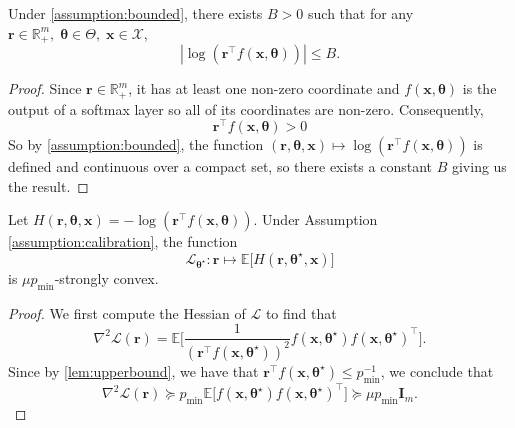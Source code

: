 \begin{lemma}
\label{lem:termbound}
    Under \cref{assumption:bounded}, there exists $B>0$ such that for any $\boldsymbol{r} \in \mathbb{R}_{+}^m,\; \boldsymbol{\theta} \in \Theta,\; \boldsymbol{x} \in \mathcal{X}$,
    \[
        |\log(\boldsymbol{r}^\top f(\boldsymbol{x}, \boldsymbol{\theta}))| \leq B.
    \]
\end{lemma}
\begin{proof}
    Since $\boldsymbol{r} \in \mathbb{R}_{+}^m$, it has at least one non-zero coordinate and $f(\boldsymbol{x}, \boldsymbol{\theta})$ is the output of a softmax layer so all of its coordinates are non-zero. Consequently,
    \[
    \boldsymbol{r}^\top f(\boldsymbol{x}, \boldsymbol{\theta}) > 0
    \]
    So by \cref{assumption:bounded}, the function $(\boldsymbol{r}, \boldsymbol{\theta}, \boldsymbol{x}) \mapsto \log(\boldsymbol{r}^\top f(\boldsymbol{x}, \boldsymbol{\theta}))$ is defined and continuous over a compact set, so there exists a constant $B$ giving us the result. 
\end{proof}

\begin{lemma}
\label{lem:popcvx_con} 
Let $H(\boldsymbol{r}, \boldsymbol{\theta}, \boldsymbol{x}) = -\log(\boldsymbol{r}^\top f(\boldsymbol{x}, \boldsymbol{\theta}))$. 
Under Assumption \cref{assumption:calibration}, the function 
\[
\mathcal{L}_{\boldsymbol{\theta}^\star}: \boldsymbol{r} \mapsto \mathbb{E}\bigg[H(\boldsymbol{r}, \boldsymbol{\theta}^\star, \boldsymbol{x})\bigg]
\]
is $\mu p_{\min}$-strongly convex.
\end{lemma}
\begin{proof}
    We first compute the Hessian of $\mathcal{L}$ to find that
    \[
    \nabla^2 \mathcal{L}(\boldsymbol{r}) = \mathbb{E}\bigg[\frac{1}{(\boldsymbol{r}^\top f(\boldsymbol{x}, \boldsymbol{\theta}^\star))^2}f(\boldsymbol{x}, \boldsymbol{\theta}^\star) f(\boldsymbol{x}, \boldsymbol{\theta}^\star)^\top \bigg].
    \]
    Since by \cref{lem:upperbound}, we have that $\boldsymbol{r}^\top f(\boldsymbol{x}, \boldsymbol{\theta}^\star) \leq p_{\min}^{-1}$, we conclude that
    \[
    \nabla^2 \mathcal{L}(\boldsymbol{r}) \succeq p_{\min}  \mathbb{E}\bigg[f(\boldsymbol{x}, \boldsymbol{\theta}^\star) f(\boldsymbol{x}, \boldsymbol{\theta}^\star)^\top \bigg] \succeq \mu p_{\min} \mathbf{I}_m.
    \]
\end{proof}

